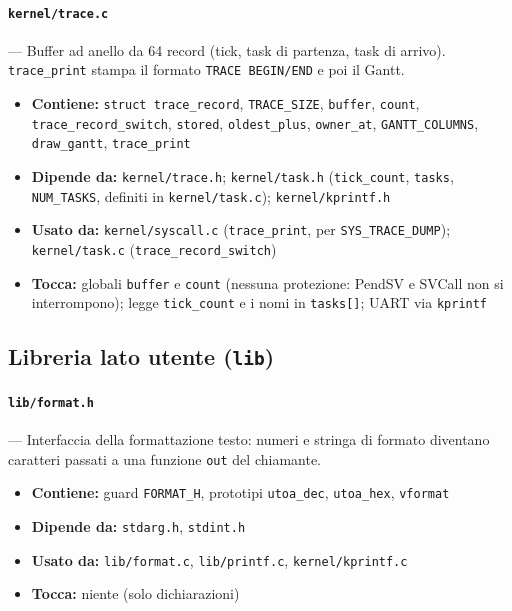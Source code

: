 \paragraph{\texttt{kernel/trace.c}} --- Buffer ad anello da 64 record (tick, task di partenza, task di arrivo). \texttt{trace\_print} stampa il formato \texttt{TRACE BEGIN/END} e poi il Gantt.
\begin{itemize}
  \item \textbf{Contiene:} \texttt{struct trace\_record}, \texttt{TRACE\_SIZE}, \texttt{buffer}, \texttt{count}, \texttt{trace\_record\_switch}, \texttt{stored}, \texttt{oldest\_plus}, \texttt{owner\_at}, \texttt{GANTT\_COLUMNS}, \texttt{draw\_gantt}, \texttt{trace\_print}
  \item \textbf{Dipende da:} \texttt{kernel/trace.h}; \texttt{kernel/task.h} (\texttt{tick\_count}, \texttt{tasks}, \texttt{NUM\_TASKS}, definiti in \texttt{kernel/task.c}); \texttt{kernel/kprintf.h}
  \item \textbf{Usato da:} \texttt{kernel/syscall.c} (\texttt{trace\_print}, per \texttt{SYS\_TRACE\_DUMP}); \texttt{kernel/task.c} (\texttt{trace\_record\_switch})
  \item \textbf{Tocca:} globali \texttt{buffer} e \texttt{count} (nessuna protezione: PendSV e SVCall non si interrompono); legge \texttt{tick\_count} e i nomi in \texttt{tasks[]}; UART via \texttt{kprintf}
\end{itemize}

\subsection{Libreria lato utente (\texttt{lib})}

\paragraph{\texttt{lib/format.h}} --- Interfaccia della formattazione testo: numeri e stringa di formato diventano caratteri passati a una funzione \texttt{out} del chiamante.
\begin{itemize}
  \item \textbf{Contiene:} guard \texttt{FORMAT\_H}, prototipi \texttt{utoa\_dec}, \texttt{utoa\_hex}, \texttt{vformat}
  \item \textbf{Dipende da:} \texttt{stdarg.h}, \texttt{stdint.h}
  \item \textbf{Usato da:} \texttt{lib/format.c}, \texttt{lib/printf.c}, \texttt{kernel/kprintf.c}
  \item \textbf{Tocca:} niente (solo dichiarazioni)
\end{itemize}


